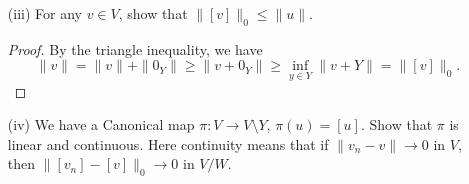 \documentclass[a4paper]{article}
\begin{document}
\begin{enumerate}
\begin{proof}
\begin{enumerate}
                \begin{align*}
                    \|[\alpha v] \|_{0} &= \|\alpha v + Y\|_{0} \\
                                        &= \inf_{y \in Y} \|\alpha v + Y \| \\
                                        &= \inf_{y \in Y} \| \alpha (v + Y )\| \\
                                        &= \inf_{y \in Y} | \alpha | \| v + Y \| \\
                                        &= | \alpha |  \inf_{y \in Y} \|v + Y\| \tag{\( \|\cdot\| \) is a norm} \\
                                        &=  | \alpha |  \|[v]\|_{0}.
                \end{align*}
            \item[(III)] Let \( {v}_{1}, {v}_{2} \in V / W  \). Then since \( \|\cdot\| \) is a norm, we have that  
                \begin{align*}
                    \|[{v}_{1} + {v}_{2}]\|_{0} &= \|({v}_{1} + {v}_{2}) + Y \|_{0} \\
                                                &=  \| ({v}_{1} + Y) + ({v}_{2} + Y) \|_0 \\
                                                &= \inf_{y \in Y} \| ({v}_{1} + {y}_{1})  + ({v}_{2} + {y}_{2}) \| \\
                                                &\leq \inf_{y \in Y} \Big[ \| {v}_{1} + {y}_{1} \| + \| {v}_{2} + {y}_{2} \| \Big] \\
                                                &= \inf_{y \in Y} \|{v}_{1} + {y}_{1}\| + \inf_{y \in Y} \|{v}_{2} + {y}_{2}\| \\
                                                &= \|[{v}_{1}]\|_{0} + \|[{v}_{2}]\|_{0}.
                \end{align*}
        \end{enumerate}
        \end{proof}
    \item[(iii)] For any \( v \in V  \), show that \( \|[v]\|_{0} \leq \|u\| \).
        \begin{proof}
            By the triangle inequality, we have 
            \[ \|v\| =   \|v \| + \|{0}_{Y}\| \geq \| v + {0}_{Y} \| \geq \inf_{y \in Y} \|v + Y \| = \|[v]\|_{0}.  \]
        \end{proof}
    \item[(iv)] We have a Canonical map \( \pi : V \to V \setminus  Y  \), \( \pi(u) = [u] \). Show that \( \pi  \) is linear and continuous. Here continuity means that if \( \|v_n - v \| \to 0  \) in \( V  \), then \( \|[{v}_{n}] - [v]\|_{0} \to 0  \) in \( V  / W  \).

\end{enumerate}
\end{document}
